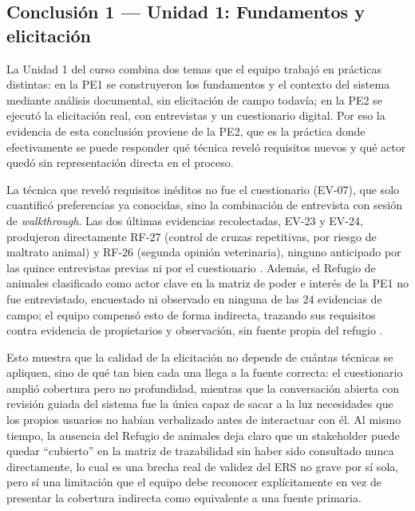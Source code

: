 \documentclass[journal,onecolumn]{IEEEtran}
\begin{document}
\subsection*{Conclusión 1 --- Unidad 1: Fundamentos y elicitación}
\label{sec:conclusion1}

La Unidad 1 del curso combina dos temas que el equipo trabajó en prácticas
distintas: en la PE1 se construyeron los fundamentos y el contexto del
sistema mediante análisis documental, sin elicitación de campo todavía; en
la PE2 se ejecutó la elicitación real, con entrevistas y un cuestionario
digital. Por eso la evidencia de esta conclusión proviene de la PE2, que es
la práctica donde efectivamente se puede responder qué técnica reveló
requisitos nuevos y qué actor quedó sin representación directa en el
proceso.

La técnica que reveló requisitos inéditos no fue el cuestionario (EV-07),
que solo cuantificó preferencias ya conocidas, sino la combinación de
entrevista con sesión de \emph{walkthrough}. Las dos últimas evidencias
recolectadas, EV-23 y EV-24, produjeron directamente RF-27 (control de
cruzas repetitivas, por riesgo de maltrato animal) y RF-26 (segunda opinión
veterinaria), ninguno anticipado por las quince entrevistas previas ni por
el cuestionario \cite{pohl2025}. Además, el Refugio de animales
clasificado como actor clave en la matriz de poder e interés de la PE1
no fue entrevistado, encuestado ni observado en ninguna de las 24
evidencias de campo; el equipo compensó esto de forma indirecta, trazando
sus requisitos contra evidencia de propietarios y observación, sin fuente
propia del refugio \cite{swebok2024}.

Esto muestra que la calidad de la elicitación no depende de cuántas
técnicas se apliquen, sino de qué tan bien cada una llega a la fuente
correcta: el cuestionario amplió cobertura pero no profundidad, mientras
que la conversación abierta con revisión guiada del sistema fue la única
capaz de sacar a la luz necesidades que los propios usuarios no habían
verbalizado antes de interactuar con él. Al mismo tiempo, la ausencia del
Refugio de animales deja claro que un stakeholder puede quedar
``cubierto'' en la matriz de trazabilidad sin haber sido consultado nunca
directamente, lo cual es una brecha real de validez del ERS no grave
por sí sola, pero sí una limitación que el equipo debe reconocer
explícitamente en vez de presentar la cobertura indirecta como
equivalente a una fuente primaria.



\printbibliography[heading=none]
\end{document}
